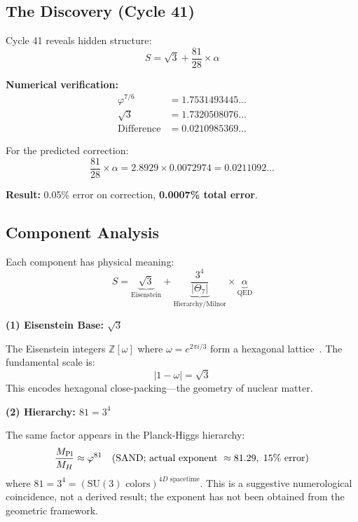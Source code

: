 \documentclass[aps,prd,twocolumn,superscriptaddress,floatfix,nofootinbib]{revtex4-2}
\theoremstyle{definition}
\theoremstyle{remark}
\newcommand{\vp}{\varphi}
\newcommand{\Th}{\Theta}
\begin{document}
\subsection{The Discovery (Cycle 41)}

Cycle 41 reveals hidden structure:
\begin{equation}
\boxed{S = \sqrt{3} + \frac{81}{28} \times \alpha}
\label{eq:stiffness-decomp}
\end{equation}

\textbf{Numerical verification:}
\begin{align}
\vp^{7/6} &= 1.7531493445... \\
\sqrt{3} &= 1.7320508076... \\
\text{Difference} &= 0.0210985369...
\end{align}

For the predicted correction:
\begin{equation}
\frac{81}{28} \times \alpha = 2.8929 \times 0.0072974 = 0.0211092...
\end{equation}

\textbf{Result:} 0.05\% error on correction, \textbf{0.0007\% total error}.

\subsection{Component Analysis}

Each component has physical meaning:
\begin{equation}
S = \underbrace{\sqrt{3}}_{\text{Eisenstein}} + \underbrace{\frac{3^4}{|\Th_7|}}_{\text{Hierarchy/Milnor}} \times \underbrace{\alpha}_{\text{QED}}
\end{equation}

\textbf{(1) Eisenstein Base: $\sqrt{3}$}

The Eisenstein integers $\mathbb{Z}[\omega]$ where $\omega = e^{2\pi i/3}$ form a hexagonal lattice~\cite{eisenstein}. The fundamental scale is:
\begin{equation}
|1 - \omega| = \sqrt{3}
\end{equation}
This encodes hexagonal close-packing---the geometry of nuclear matter.

\textbf{(2) Hierarchy: $81 = 3^4$}

The same factor appears in the Planck-Higgs hierarchy:
\begin{equation}
\frac{M_{\rm Pl}}{M_H} \approx \vp^{81} \quad (\text{SAND; actual exponent } \approx 81.29,\;\text{15\% error})
\end{equation}
where $81 = 3^4 = (\text{SU}(3)\text{ colors})^{4D\text{ spacetime}}$. This is a suggestive numerological coincidence, not a derived result; the exponent has not been obtained from the geometric framework.
\end{document}
